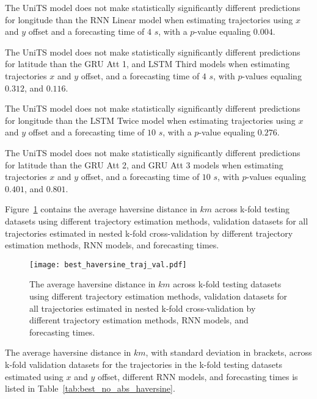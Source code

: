 The UniTS model does not make statistically significantly different predictions for longitude than the RNN Linear model when estimating trajectories using $x$ and $y$ offset and a forecasting time of $4$ $s$, with a $p$-value equaling $0.004$.

The UniTS model does not make statistically significantly different predictions for latitude than the GRU Att 1, and LSTM Third models when estimating trajectories $x$ and $y$ offset, and a forecasting time of $4$ $s$, with $p$-values equaling $0.312$, and $0.116$.

The UniTS model does not make statistically significantly different predictions for longitude than the LSTM Twice model when estimating trajectories using $x$ and $y$ offset and a forecasting time of $10$ $s$, with a $p$-value equaling $0.276$.

The UniTS model does not make statistically significantly different predictions for latitude than the GRU Att 2, and GRU Att 3 models when estimating trajectories $x$ and $y$ offset, and a forecasting time of $10$ $s$, with $p$-values equaling $0.401$, and $0.801$.

Figure~\ref{fig:best_haversine_traj_val} contains the average haversine distance in $km$ across k-fold testing datasets using different trajectory estimation methods, validation datasets for all trajectories estimated in nested k-fold cross-validation by different trajectory estimation methods, RNN models, and forecasting times.

\begin{figure}[!ht]
	\centering
	\texttt{[image: best\_haversine\_traj\_val.pdf]}
	\caption{The average haversine distance in $km$ across k-fold testing datasets using different trajectory estimation methods, validation datasets for all trajectories estimated in nested k-fold cross-validation by different trajectory estimation methods, RNN models, and forecasting times.}
	\label{fig:best_haversine_traj_val}
\end{figure}

The average haversine distance in $km$, with standard deviation in brackets, across k-fold validation datasets for the trajectories in the k-fold testing datasets estimated using $x$ and $y$ offset, different RNN models, and forecasting times is listed in Table~\ref{tab:best_no_abs_haversine}.

